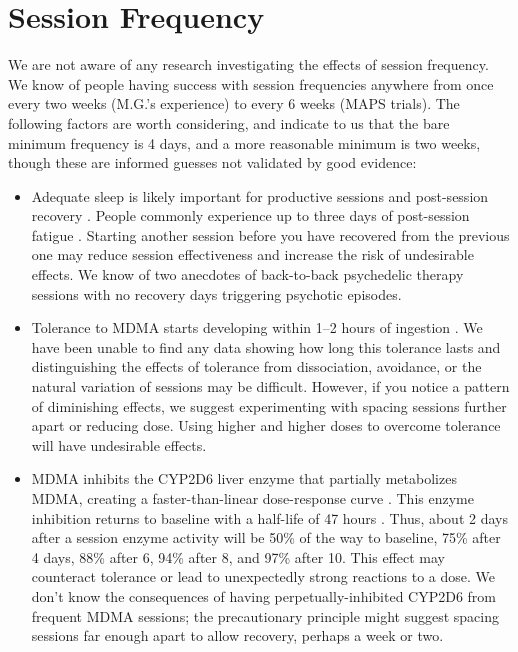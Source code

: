 \documentclass[12pt,letterpaper]{book}
\begin{document}
\section{Session Frequency}
We are not aware of any research investigating the effects of session frequency. We know of people having success with session frequencies anywhere from once every two weeks (M.G.'s experience) to every 6 weeks (MAPS trials). The following factors are worth considering, and indicate to us that the bare minimum frequency is 4 days, and a more reasonable minimum is two weeks, though these are informed guesses not validated by good evidence:
\begin{itemize}
    \item Adequate sleep is likely important for productive sessions and post-session recovery \cite{simon2020sleep}. People commonly experience up to three days of post-session fatigue \cite{liechtiGender}. Starting another session before you have recovered from the previous one may reduce session effectiveness and increase the risk of undesirable effects. We know of two anecdotes of back-to-back psychedelic therapy sessions with no recovery days triggering psychotic episodes. 
    \item Tolerance to MDMA starts developing within 1–2 hours of ingestion \cite{farreTolerance,parrottTolerance}. We have been unable to find any data showing how long this tolerance lasts and distinguishing the effects of tolerance from dissociation, avoidance, or the natural variation of sessions may be difficult. However, if you notice a pattern of diminishing effects, we suggest experimenting with spacing sessions further apart or reducing dose. Using higher and higher doses to overcome tolerance will have undesirable effects.
    \item MDMA inhibits the CYP2D6 liver enzyme that partially metabolizes MDMA, creating a faster-than-linear dose-response curve \cite{de2000nonlinear}. This enzyme inhibition returns to baseline with a half-life of 47 hours \cite{omathunaCYP}. Thus, about 2 days after a session enzyme activity will be 50\% of the way to baseline, 75\% after 4 days, 88\% after 6, 94\% after 8, and 97\% after 10. This effect may counteract tolerance or lead to unexpectedly strong reactions to a dose. We don't know the consequences of having perpetually-inhibited CYP2D6 from frequent MDMA sessions; the precautionary principle might suggest spacing sessions far enough apart to allow recovery, perhaps a week or two.

\end{itemize}
\end{document}
